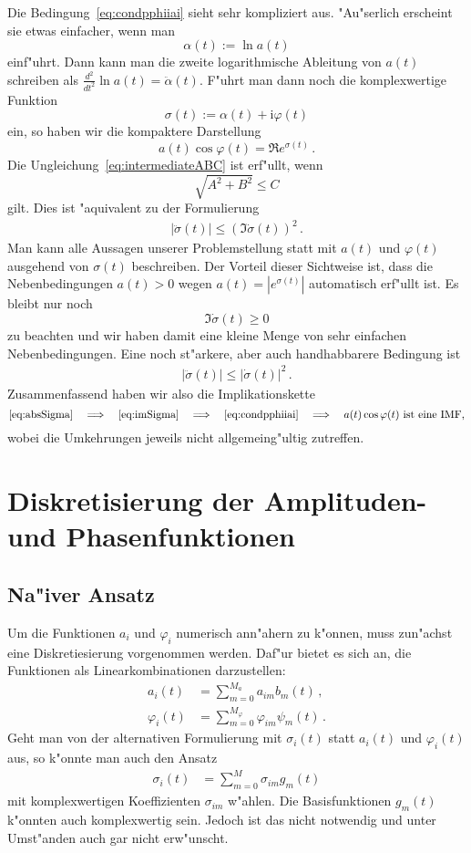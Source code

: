 \documentclass[a4paper]{scrartcl}
\newcommand{\ii}{{\mathrm{i}}}
\newcommand{\pphi}{{\varphi}}
\begin{document}
Die Bedingung~\eqref{eq:condpphiiai} sieht sehr kompliziert aus. 
"Au"serlich erscheint sie etwas einfacher, wenn man
$$ \alpha(t):=\ln a(t) $$
einf"uhrt. Dann kann man die zweite logarithmische Ableitung von $a(t)$ schreiben als $\frac{d^2}{dt^2}\ln a(t) = \ddot\alpha(t)$. 
F"uhrt man dann noch die komplexwertige Funktion
$$ \sigma(t) := \alpha(t) + \ii\pphi(t) $$
ein, so haben wir die kompaktere Darstellung
$$ a(t)\cos\pphi(t) = \Re e^{\sigma(t)}\,. $$
Die Ungleichung~\eqref{eq:intermediateABC} ist erf"ullt, wenn 
$$ \sqrt{A^2 + B^2} \le C $$
gilt. Dies ist "aquivalent zu der Formulierung
\begin{align} \label{eq:imSigma}
  \lvert\ddot\sigma(t)\rvert \le \left(\Im\dot\sigma(t)\right)^2\,.
\end{align}
Man kann alle Aussagen unserer Problemstellung statt mit $a(t)$ und $\pphi(t)$ ausgehend von $\sigma(t)$ beschreiben. 
Der Vorteil dieser Sichtweise ist, dass die Nebenbedingungen $a(t)>0$ wegen $a(t)=|e^{\sigma(t)}|$ automatisch erf"ullt ist. 
Es bleibt nur noch 
$$ \Im\dot\sigma(t)\ge0 $$ 
zu beachten und wir haben damit eine kleine Menge von sehr einfachen Nebenbedingungen. 
Eine noch st"arkere, aber auch handhabbarere Bedingung ist 
\begin{align} \label{eq:absSigma}
  \lvert\ddot\sigma(t)\rvert \le\lvert\dot\sigma(t)\rvert^2\,.
\end{align}
Zusammenfassend haben wir also die Implikationskette 
$$ \text{\eqref{eq:absSigma}} \quad \Longrightarrow \quad
  \text{\eqref{eq:imSigma}} \quad \Longrightarrow \quad
  \text{\eqref{eq:condpphiiai}} \quad \Longrightarrow \quad
  \text{$a(t)\cos\pphi(t)$ ist eine IMF,} $$
wobei die Umkehrungen jeweils nicht allgemeing"ultig zutreffen. 


\section{Diskretisierung der Amplituden- und Phasenfunktionen} \label{sec:discretize}

\subsection{Na"iver Ansatz}

Um die Funktionen $a_i$ und $\pphi_i$ numerisch ann"ahern zu k"onnen, muss zun"achst eine Diskretiesierung vorgenommen werden. 
Daf"ur bietet es sich an, die Funktionen als Linearkombinationen darzustellen:
\begin{align*}
      a_i(t) &= \sum_{m=0}^{M_a    }     a_{im}    b_m(t)\,, \\ 
  \pphi_i(t) &= \sum_{m=0}^{M_\pphi} \pphi_{im} \psi_m(t)\,.
\end{align*}
Geht man von der alternativen Formulierung mit $\sigma_i(t)$ statt $a_i(t)$ und $\pphi_i(t)$ aus, so k"onnte man auch den Ansatz
\begin{align*}
  \sigma_i(t) &= \sum_{m=0}^M \sigma_{im}g_m(t)
\end{align*}
mit komplexwertigen Koeffizienten $\sigma_{im}$ w"ahlen. 
Die Basisfunktionen $g_m(t)$ k"onnten auch komplexwertig sein. 
Jedoch ist das nicht notwendig und unter Umst"anden auch gar nicht erw"unscht. 
\end{document}
